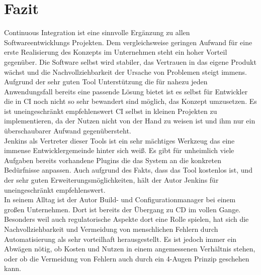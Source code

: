 \pagebreak

\chapter{Fazit}
Continuous Integration ist eine sinnvolle Ergänzung zu allen Softwareentwicklungs Projekten. Dem vergleichsweise geringen Aufwand für eine erste Realisierung des Konzepts im Unternehmen steht ein hoher Vorteil gegenüber. Die Software selbst wird stabiler, das Vertrauen in das eigene Produkt wächst und die Nachvollziehbarkeit der Ursache von Problemen steigt immens.
Aufgrund der sehr guten Tool Unterstützung die für nahezu jeden Anwendungsfall bereits eine passende Lösung bietet ist es selbst für Entwickler die in CI noch nicht so sehr bewandert sind möglich, das Konzept umzusetzen.
Es ist uneingeschränkt empfehlenswert CI selbst in kleinen Projekten zu implementieren, da der Nutzen nicht von der Hand zu weisen ist und ihm nur ein überschaubarer Aufwand gegenübersteht.\\
Jenkins als Vertreter dieser Tools ist ein sehr mächtiges Werkzeug das eine immense Entwicklergemeinde hinter sich weiß. Es gibt für unheimlich viele Aufgaben bereits vorhandene Plugins die das System an die konkreten Bedürfnisse anpassen. Auch aufgrund des Fakts, dass das Tool kostenlos ist, und der sehr guten Erweiterungsmöglichkeiten, hält der Autor Jenkins für uneingeschränkt empfehlenswert.\\
In seinem Alltag ist der Autor Build- und Configurationmanager bei einem großen Unternehmen. Dort ist bereits der Übergang zu CD im vollen Gange. Besonders weil auch regulatorische Aspekte dort eine Rolle spielen, hat sich die Nachvollziehbarkeit und Vermeidung von menschlichen Fehlern durch Automatisierung als sehr vorteilhaft herausgestellt. Es ist jedoch immer ein Abwägen nötig, ob Kosten und Nutzen in einem angemessenen Verhältnis stehen, oder ob die Vermeidung von Fehlern auch durch ein 4-Augen Prinzip geschehen kann.
